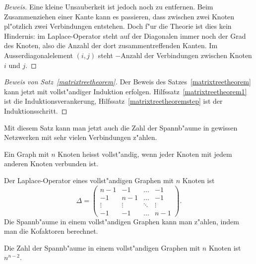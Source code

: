 \begin{proof}[Beweis]
Eine kleine Unsauberkeit ist jedoch noch zu entfernen.
Beim Zusammenziehen einer Kante kann es passieren, dass zwischen zwei
Knoten pl"otzlich zwei Verbindungen entstehen. Doch f"ur die
Theorie ist dies kein Hindernis: im Laplace-Operator steht
auf der Diagonalen immer noch der Grad des Knoten, also die Anzahl
der dort zusammentreffenden Kanten. Im Ausserdiagonalelement $(i,j)$
steht $-\text{Anzahl}$ der Verbindungen zwischen Knoten $i$ und $j$.
\end{proof}

\begin{proof}[Beweis von Satz~\ref{matrixtreetheorem}]
Der Beweis des Satzes~\ref{matrixtreetheorem} kann jetzt mit vollst"andiger
Induktion erfolgen.
Hilfssatz~\ref{matrixtreetheorem1} ist die Induktionsverankerung,
Hilfssatz~\ref{matrixtreetheoremstep} ist der Induktionsschritt.
\end{proof}

Mit diesem Satz kann man jetzt auch die Zahl der Spannb"aume in gewissen
Netzwerken mit sehr vielen Verbindungen z"ahlen. 
\begin{definition}
Ein Graph mit $n$ Knoten heisst vollst"andig, wenn jeder Knoten mit
jedem anderen Knoten verbunden ist.
\end{definition}
Der Laplace-Operator eines vollst"andigen Graphen mit $n$ Knoten ist
\[
\Delta=\begin{pmatrix}
n-1   &  -1  & \dots & -1 \\
 -1   & n-1  & \dots & -1 \\
\vdots&\vdots&\ddots &\vdots\\
 -1   &  -1  &\dots  &n-1
\end{pmatrix}.
\]
Die Spannb"aume in einem vollst"andigen Graphen kann man z"ahlen, indem
man die Kofaktoren berechnet.

\begin{satz}[Cayley]
Die Zahl der Spannb"aume in einem vollst"andigen Graphen mit $n$ 
Knoten ist $n^{n-2}$.
\end{satz}

